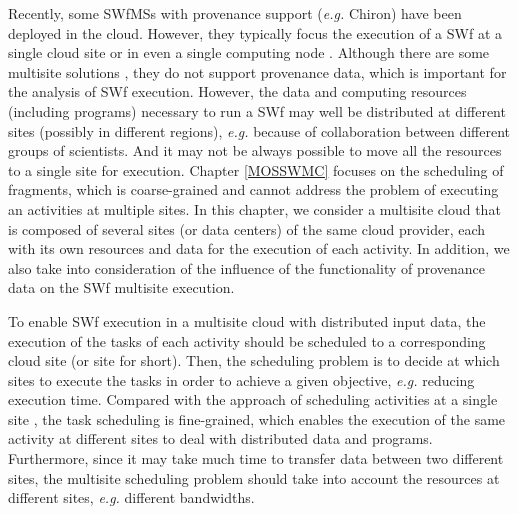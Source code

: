 Recently, some SWfMSs with provenance support (\textit{e.g.} Chiron) have been deployed in the cloud.
However,  they typically focus the execution of a SWf at a single cloud site or in even a single computing node \cite{Hiden2010}\cite{Hiden2012}. Although there are some multisite solutions \cite{Duan2014}\cite{Luis2015}, they do not support provenance data, which is important for the analysis of SWf execution.
However, the data and computing resources (including programs) necessary to run a SWf
may well be distributed at different sites (possibly in different regions), \textit{e.g.} because of collaboration between different groups of scientists.
And it may not be always possible to move all the resources to a single site for execution.
Chapter \ref{MOSSWMC} focuses on the scheduling of fragments, which is coarse-grained and cannot address the problem of executing an activities at multiple sites.
In this chapter, we consider a multisite cloud that is composed of several sites (or data centers) of the same cloud provider, each with its own resources and data for the execution of each activity. In addition, we also take into consideration of the influence of the functionality of provenance data on the SWf multisite execution.

To enable SWf execution in a multisite cloud with distributed input data, the execution
of the tasks of each activity should be scheduled to a corresponding cloud site (or site for short). Then, the scheduling problem is to decide at which sites to execute the tasks in order to achieve a given objective, \textit{e.g.} reducing execution time. 
Compared with the approach of scheduling activities at a single site \cite{Liu2014}, the task scheduling is fine-grained, which enables the execution of the same activity at different sites to deal with distributed data and programs.
Furthermore, since it may take much time to transfer data between two different sites, the multisite scheduling problem should take into account the resources at different sites, \textit{e.g.} different bandwidths.

